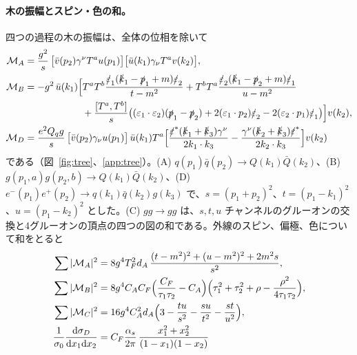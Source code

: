 \documentclass[a4paper,10pt]{ltjsarticle}
\newcommand{\dd}{\mathrm{d}}
\begin{document}
\begin{figure}[tbp]
\label{fig:twoloopct}
\end{figure}

\paragraph{木の振幅とスピン・色の和。}四つの過程の木の振幅は、全体の位相を除いて
\begin{equation}
\begin{aligned}
\mathcal M_A&=\frac{g^2}{s}\,\bigl[\bar v(p_2)\gamma^\nu T^au(p_1)\bigr]\bigl[\bar u(k_1)\gamma_\nu T^av(k_2)\bigr],\\
\mathcal M_B&=-g^2\,\bar u(k_1)\Bigl[T^aT^b\frac{\slashed\varepsilon_1(\slashed k_1-\slashed p_1+m)\slashed\varepsilon_2}{t-m^2}+T^bT^a\frac{\slashed\varepsilon_2(\slashed k_1-\slashed p_2+m)\slashed\varepsilon_1}{u-m^2}\\
&\hspace{6em}+\frac{[T^a,T^b]}{s}\bigl((\varepsilon_1\cdot\varepsilon_2)(\slashed p_1-\slashed p_2)+2(\varepsilon_1\cdot p_2)\slashed\varepsilon_2-2(\varepsilon_2\cdot p_1)\slashed\varepsilon_1\bigr)\Bigr]v(k_2),\\
\mathcal M_D&=\frac{e^2Q_qg}{s}\,\bigl[\bar v(p_2)\gamma_\nu u(p_1)\bigr]\,\bar u(k_1)T^a\Bigl[\frac{\slashed\varepsilon^*(\slashed k_1+\slashed k_3)\gamma^\nu}{2k_1\cdot k_3}-\frac{\gamma^\nu(\slashed k_2+\slashed k_3)\slashed\varepsilon^*}{2k_2\cdot k_3}\Bigr]v(k_2)
\end{aligned}
\label{eq:Mtree}
\end{equation}
である（図~\ref{fig:tree}、\ref{app:tree}）。(A) $q(p_1)\bar q(p_2)\to Q(k_1)\bar Q(k_2)$、(B) $g(p_1,a)g(p_2,b)\to Q(k_1)\bar Q(k_2)$、(D) $e^-(p_1)e^+(p_2)\to q(k_1)\bar q(k_2)g(k_3)$ で、$s=(p_1+p_2)^2$、$t=(p_1-k_1)^2$、$u=(p_1-k_2)^2$ とした。(C) $gg\to gg$ は、$s,t,u$ チャンネルのグルーオンの交換と4グルーオンの頂点の四つの図の和である。外線のスピン、偏極、色について和をとると
\begin{equation}
\begin{aligned}
\sum|\mathcal M_A|^2&=8g^4T_F^2d_A\,\frac{(t-m^2)^2+(u-m^2)^2+2m^2s}{s^2},\\
\sum|\mathcal M_B|^2&=8g^4C_AC_F\Bigl(\frac{C_F}{\tau_1\tau_2}-C_A\Bigr)\Bigl(\tau_1^2+\tau_2^2+\rho-\frac{\rho^2}{4\tau_1\tau_2}\Bigr),\\
\sum|\mathcal M_C|^2&=16g^4C_A^2d_A\Bigl(3-\frac{tu}{s^2}-\frac{su}{t^2}-\frac{st}{u^2}\Bigr),\\
\frac{1}{\sigma_0}\frac{\dd\sigma_D}{\dd x_1\dd x_2}&=C_F\frac{\alpha_s}{2\pi}\,\frac{x_1^2+x_2^2}{(1-x_1)(1-x_2)}
\end{aligned}
\label{eq:sumtree}
\end{equation}
\end{document}
